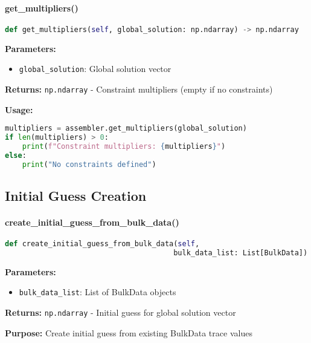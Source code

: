 \paragraph{get\_multipliers()}\leavevmode
\begin{lstlisting}[language=Python, caption=Get Multipliers Method]
def get_multipliers(self, global_solution: np.ndarray) -> np.ndarray
\end{lstlisting}

\textbf{Parameters:}
\begin{itemize}
    \item \texttt{global\_solution}: Global solution vector
\end{itemize}

\textbf{Returns:} \texttt{np.ndarray} - Constraint multipliers (empty if no constraints)

\textbf{Usage:}
\begin{lstlisting}[language=Python, caption=Multiplier Extraction Usage]
multipliers = assembler.get_multipliers(global_solution)
if len(multipliers) > 0:
    print(f"Constraint multipliers: {multipliers}")
else:
    print("No constraints defined")
\end{lstlisting}

\subsection{Initial Guess Creation}
\label{subsec:initial_guess_creation}

\paragraph{create\_initial\_guess\_from\_bulk\_data()}\leavevmode
\begin{lstlisting}[language=Python, caption=Initial Guess from BulkData Method]
def create_initial_guess_from_bulk_data(self, 
                                       bulk_data_list: List[BulkData]) -> np.ndarray
\end{lstlisting}

\textbf{Parameters:}
\begin{itemize}
    \item \texttt{bulk\_data\_list}: List of BulkData objects
\end{itemize}

\textbf{Returns:} \texttt{np.ndarray} - Initial guess for global solution vector

\textbf{Purpose:} Create initial guess from existing BulkData trace values

